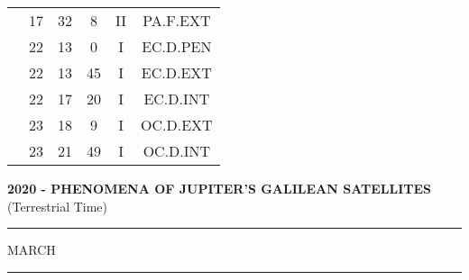 \documentclass[12pt, a4paper]{article}
\begin{document}
\begin{multicols}{3}
{\begin{tabular}{c c c c c c}
	 	 	 	 & 17 & 32 & 8 & II & PA.F.EXT\\%
	 	 	 	 & 22 & 13 & 0 & I & EC.D.PEN\\%
	 	 	 	 & 22 & 13 & 45 & I & EC.D.EXT\\%
	 	 	 	 & 22 & 17 & 20 & I & EC.D.INT\\%
	 	 	 	 & 23 & 18 & 9 & I & OC.D.EXT\\%
	 	 	 	 & 23 & 21 & 49 & I & OC.D.INT\\%
	 	 \end{tabular}
 	}
\end{multicols}
\textbf{2020 - PHENOMENA OF JUPITER'S GALILEAN SATELLITES}\\(Terrestrial Time) 
\vspace{0.1cm} \hrule \vspace{0.1cm}
MARCH\vspace{0.1cm}
\hrule
\vspace{-0.2cm}
\end{document}
